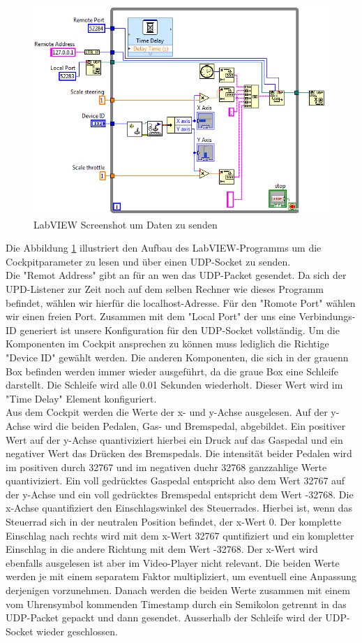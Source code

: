 \begin{figure}[H]
\centering 
\includegraphics[width=0.8\linewidth]{src/labview_screenshot_videoplayer_daten_senden.png}
\caption{LabVIEW Screenshot um Daten zu senden} %
\label{labview_screenshot_videoplayer_daten_senden} %
\end{figure}
Die Abbildung \ref{labview_screenshot_videoplayer_daten_senden} illustriert den Aufbau des LabVIEW-Programms um die Cockpitparameter zu lesen und über einen UDP-Socket zu senden.\\
Die "Remot Address" gibt an für an wen das UDP-Packet gesendet. Da sich der UPD-Listener zur Zeit noch auf dem selben Rechner wie dieses Programm befindet, wählen wir hierfür die localhost-Adresse. Für den "Romote Port" wählen wir einen freien Port. Zusammen mit dem "Local Port" der uns eine Verbindungs-ID generiert ist unsere Konfiguration für den UDP-Socket vollständig. Um die Komponenten im Cockpit ansprechen zu können muss lediglich die Richtige "Device ID" gewählt werden. Die anderen Komponenten, die sich in der grauenn Box befinden werden immer wieder ausgeführt, da die graue Box eine Schleife darstellt. Die Schleife wird alle 0.01 Sekunden wiederholt. Dieser Wert wird im "Time Delay" Element konfiguriert. \\
Aus dem Cockpit werden die Werte der x- und y-Achse ausgelesen. Auf der y-Achse wird die beiden Pedalen, Gas- und Bremspedal, abgebildet. Ein positiver Wert auf der y-Achse quantiviziert hierbei ein Druck auf das Gaspedal und ein negativer Wert das Drücken des Bremspedals. Die intensität beider Pedalen wird im positiven durch 32767 und im negativen duchr 32768 ganzzahlige Werte quantiviziert. Ein voll gedrücktes Gaspedal entspricht also dem Wert 32767 auf der y-Achse und ein voll gedrücktes Bremspedal entspricht dem Wert -32768. Die x-Achse quantifiziert den Einschlagswinkel des Steuerrades. Hierbei ist, wenn das Steuerrad sich in der neutralen Position befindet, der x-Wert 0. Der komplette Einschlag nach rechts wird mit dem x-Wert 32767 quntifiziert und ein kompletter Einschlag in die andere Richtung mit dem Wert -32768. Der x-Wert wird ebenfalls ausgelesen ist aber im Video-Player nicht relevant. Die beiden Werte werden je mit einem separatem Faktor multipliziert, um eventuell eine Anpassung derjenigen vorzunehmen. Danach werden die beiden Werte zusammen mit einem vom Uhrensymbol kommenden Timestamp durch ein Semikolon getrennt in das UDP-Packet gepackt und dann gesendet. Ausserhalb der Schleife wird der UDP-Socket wieder geschlossen.

